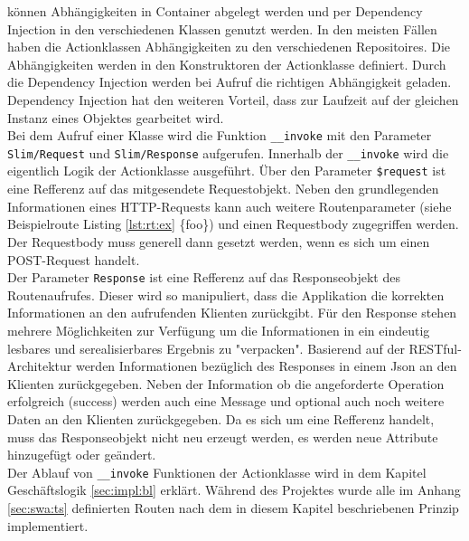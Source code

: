 \documentclass[10pt, oneside]{article}
\begin{document}
    können Abhängigkeiten in Container abgelegt werden und per Dependency Injection in den verschiedenen Klassen genutzt werden. 
    In den meisten Fällen haben die Actionklassen Abhängigkeiten zu den verschiedenen Repositoires. 
    Die Abhängigkeiten werden in den Konstruktoren der Actionklasse definiert. Durch die Dependency Injection
    werden bei Aufruf die richtigen Abhängigkeit geladen. Dependency Injection hat den weiteren Vorteil, dass zur Laufzeit auf der gleichen
    Instanz eines Objektes gearbeitet wird.\\
    Bei dem Aufruf einer Klasse wird die Funktion \lstinline{__invoke} mit den Parameter \lstinline{Slim/Request} und \lstinline{Slim/Response} aufgerufen. 
    Innerhalb der \lstinline{__invoke} wird die eigentlich Logik der Actionklasse ausgeführt. 
    Über den Parameter \lstinline{$request} ist eine Refferenz auf das mitgesendete Requestobjekt. Neben den grundlegenden Informationen eines HTTP-Requests 
    kann auch weitere Routenparameter (siehe Beispielroute Listing \ref{lst:rt:ex} \{foo\}) und einen Requestbody zugegriffen werden. Der Requestbody muss generell 
    dann gesetzt werden, wenn es sich um einen POST-Request handelt.\\  
    Der Parameter \lstinline{Response} ist eine Refferenz auf das Responseobjekt des Routenaufrufes. Dieser wird so manipuliert, dass die Applikation die korrekten Informationen an den aufrufenden Klienten zurückgibt. 
    Für den Response stehen mehrere Möglichkeiten zur Verfügung um die Informationen in ein eindeutig lesbares und serealisierbares Ergebnis zu "verpacken". 
    Basierend auf der RESTful-Architektur werden Informationen bezüglich des Responses in einem Json an den Klienten zurückgegeben. Neben der Information ob 
    die angeforderte Operation erfolgreich (success) werden auch eine Message und optional auch noch weitere Daten an den Klienten zurückgegeben.
    Da es sich um eine Refferenz handelt, muss das Responseobjekt nicht neu erzeugt werden, es werden neue Attribute hinzugefügt oder geändert.\\
    Der Ablauf von \lstinline{__invoke} Funktionen der Actionklasse wird in dem Kapitel Geschäftslogik \ref{sec:impl:bl} erklärt. 
    Während des Projektes wurde alle im Anhang \ref{sec:swa:ts} definierten Routen nach dem in diesem Kapitel beschriebenen Prinzip implementiert.   
\end{document}

